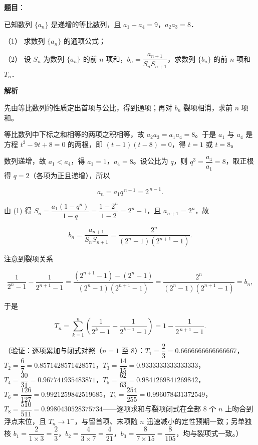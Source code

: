 \begin{answer}

\textbf{题目}：

已知数列 \(\{a_n\}\) 是递增的等比数列，且 \(a_1+a_4=9\)，\(a_2a_3=8\)．

（1） 求数列 \(\{a_n\}\) 的通项公式；

（2） 设 \(S_n\) 为数列 \(\{a_n\}\) 的前 \(n\) 项和，\(b_n=\dfrac{a_{n+1}}{S_nS_{n+1}}\)，求数列 \(\{b_n\}\) 的前 \(n\) 项和 \(T_n\)．

\textbf{解析}

先由等比数列的性质定出首项与公比，得到通项；再对 \(b_n\) 裂项相消，求前 \(n\) 项和。


等比数列中下标之和相等的两项之积相等，故 \(a_2a_3=a_1a_4=8\)。于是 \(a_1\) 与 \(a_4\) 是方程 \(t^2-9t+8=0\) 的两根，即 \((t-1)(t-8)=0\)，得 \(t=1\) 或 \(t=8\)。

数列递增，故 \(a_1<a_4\)，得 \(a_1=1\)，\(a_4=8\)。设公比为 \(q\)，则 \(q^3=\dfrac{a_4}{a_1}=8\)，取正根得 \(q=2\)（各项为正且递增），所以

\nopagebreak[4]
\[
a_n=a_1q^{\,n-1}=2^{\,n-1}.
\]


由 (1) 得 \(S_n=\dfrac{a_1(1-q^n)}{1-q}=\dfrac{1-2^n}{1-2}=2^n-1\)，且 \(a_{n+1}=2^n\)，故

\nopagebreak[4]
\[
b_n=\dfrac{a_{n+1}}{S_nS_{n+1}}=\dfrac{2^n}{(2^n-1)(2^{n+1}-1)} .
\]

注意到裂项关系

\nopagebreak[4]
\[
\dfrac{1}{2^n-1}-\dfrac{1}{2^{n+1}-1}=\dfrac{(2^{n+1}-1)-(2^n-1)}{(2^n-1)(2^{n+1}-1)}=\dfrac{2^n}{(2^n-1)(2^{n+1}-1)}=b_n ,
\]

于是

\nopagebreak[4]
\[
T_n=\sum_{k=1}^{n}\left(\dfrac{1}{2^k-1}-\dfrac{1}{2^{k+1}-1}\right)=1-\dfrac{1}{2^{\,n+1}-1}.
\]

（验证：逐项累加与闭式对照（\(n=1\) 至 \(8\)）：\(T_1=\dfrac{2}{3}=0.6666666666666667\)，\(T_2=\dfrac{6}{7}=0.8571428571428571\)，\(T_3=\dfrac{14}{15}=0.9333333333333333\)，\(T_4=\dfrac{30}{31}=0.967741935483871\)，\(T_5=\dfrac{62}{63}=0.9841269841269842\)，\(T_6=\dfrac{126}{127}=0.9921259842519685\)，\(T_7=\dfrac{254}{255}=0.996078431372549\)，\(T_8=\dfrac{510}{511}=0.9980430528375734\)——逐项求和与裂项闭式在全部 8 个 \(n\) 上吻合到浮点末位，且 \(T_n\to1^{-}\)，与留首项、末项随 \(n\) 迅速减小的定性预期一致；另单独核 \(b_1=\dfrac{2}{1\times3}=\dfrac{2}{3}\)，\(b_2=\dfrac{4}{3\times7}=\dfrac{4}{21}\)，\(b_3=\dfrac{8}{7\times15}=\dfrac{8}{105}\)，均与裂项式一致。）



\end{answer}
